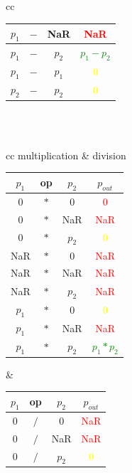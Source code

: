 \begin{table}
\begin{center}
\begin{tabular}{ cc }
\begin{tabular}{||c c c | c||}
    \hline
    $p_1$ & $-$ & NaR & \textcolor{red}{NaR} \\
    \hline
    $p_1$ & $-$ & $p_2$ & \textcolor{green}{$p_1 - p_2$} \\
    \hline %
    $p_1$ & $-$ & $p_1$ & \textcolor{yellow}{$0$} \\
    \hline
    $p_2$ & $-$ & $p_2$ & \textcolor{yellow}{$0$} \\
    \hline
\end{tabular}\\ \\
\end{tabular}
\end{center}
\begin{center}
\begin{tabular}{ cc }   %
multiplication & division \\
\begin{tabular}{||c c c | c||}
    \hline
    $p_1$ & op & $p_2$ & $p_{out}$ \\ [0.5ex]
    \hline\hline
    $0$ & $*$ & $0$ & \textcolor{red}{$0$} \\
    \hline
    $0$ & $*$ & NaR & \textcolor{red}{NaR} \\
    \hline
    $0$ & $*$ & $p_2$ & \textcolor{yellow}{$0$} \\ %
    \hline
    NaR & $*$ & $0$ & \textcolor{red}{NaR} \\
    \hline
    NaR & $*$ & NaR & \textcolor{red}{NaR} \\
    \hline
    NaR & $*$ & $p_2$ & \textcolor{red}{NaR} \\
    \hline
    $p_1$ & $*$ & $0$ & \textcolor{yellow}{$0$} \\
    \hline
    $p_1$ & $*$ & NaR & \textcolor{red}{NaR} \\
    \hline
    $p_1$ & $*$ & $p_2$ & \textcolor{green}{$p_1 * p_2$} \\
    \hline
\end{tabular} &
\begin{tabular}{||c c c | c||}
    \hline
    $p_1$ & op & $p_2$ & $p_{out}$ \\ [0.5ex]
    \hline\hline
    $0$ & $/$ & $0$ & \textcolor{red}{NaR} \\
    \hline
    $0$ & $/$ & NaR & \textcolor{red}{NaR} \\
    \hline
    $0$ & $/$ & $p_2$ & \textcolor{yellow}{$0$} \\ %

\end{tabular}
\end{tabular}
\end{center}
\end{table}
